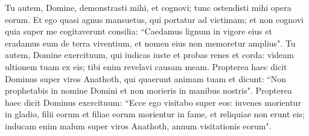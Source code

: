 \begin{biblechapter}
\verse Tu autem, Domine, demonstrasti mihi, et cognovi; tunc ostendisti mihi opera eorum. 
\verse Et ego quasi agnus mansuetus, qui portatur ad victimam; et non cognovi quia super me cogitaverunt consilia: “Caedamus lignum in vigore eius et eradamus eum de terra viventium, et nomen eius non memoretur amplius". 
\verse Tu autem, Domine exercituum, qui iudicas iuste et probas renes et corda: videam ultionem tuam ex eis; tibi enim revelavi causam meam. 
\verse Propterea haec dicit Dominus super viros Anathoth, qui quaerunt animam tuam et dicunt: “Non prophetabis in nomine Domini et non morieris in manibus nostris". 
\verse Propterea haec dicit Dominus exercituum: “Ecce ego visitabo super eos: iuvenes morientur in gladio, filii eorum et filiae eorum morientur in fame,  
\verse et reliquiae non erunt eis; inducam enim malum super viros Anathoth, annum visitationis eorum". 
\end{biblechapter}

